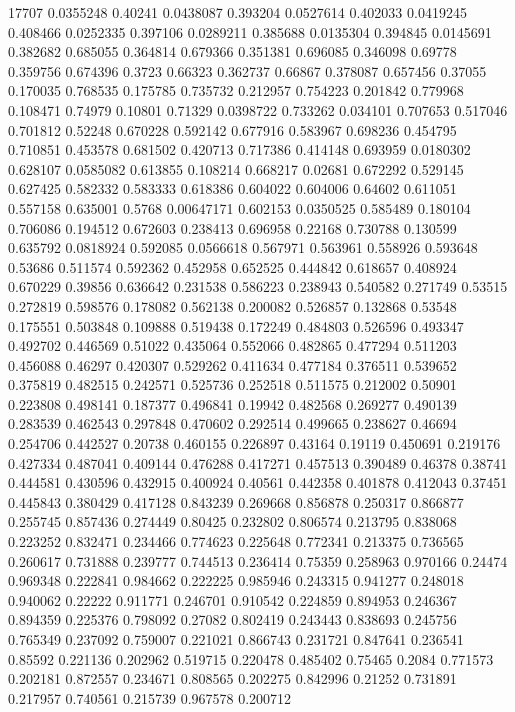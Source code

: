 17707
0.0355248 0.40241
0.0438087 0.393204
0.0527614 0.402033
0.0419245 0.408466
0.0252335 0.397106
0.0289211 0.385688
0.0135304 0.394845
0.0145691 0.382682
0.685055 0.364814
0.679366 0.351381
0.696085 0.346098
0.69778 0.359756
0.674396 0.3723
0.66323 0.362737
0.66867 0.378087
0.657456 0.37055
0.170035 0.768535
0.175785 0.735732
0.212957 0.754223
0.201842 0.779968
0.108471 0.74979
0.10801 0.71329
0.0398722 0.733262
0.034101 0.707653
0.517046 0.701812
0.52248 0.670228
0.592142 0.677916
0.583967 0.698236
0.454795 0.710851
0.453578 0.681502
0.420713 0.717386
0.414148 0.693959
0.0180302 0.628107
0.0585082 0.613855
0.108214 0.668217
0.02681 0.672292
0.529145 0.627425
0.582332 0.583333
0.618386 0.604022
0.604006 0.64602
0.611051 0.557158
0.635001 0.5768
0.00647171 0.602153
0.0350525 0.585489
0.180104 0.706086
0.194512 0.672603
0.238413 0.696958
0.22168 0.730788
0.130599 0.635792
0.0818924 0.592085
0.0566618 0.567971
0.563961 0.558926
0.593648 0.53686
0.511574 0.592362
0.452958 0.652525
0.444842 0.618657
0.408924 0.670229
0.39856 0.636642
0.231538 0.586223
0.238943 0.540582
0.271749 0.53515
0.272819 0.598576
0.178082 0.562138
0.200082 0.526857
0.132868 0.53548
0.175551 0.503848
0.109888 0.519438
0.172249 0.484803
0.526596 0.493347
0.492702 0.446569
0.51022 0.435064
0.552066 0.482865
0.477294 0.511203
0.456088 0.46297
0.420307 0.529262
0.411634 0.477184
0.376511 0.539652
0.375819 0.482515
0.242571 0.525736
0.252518 0.511575
0.212002 0.50901
0.223808 0.498141
0.187377 0.496841
0.19942 0.482568
0.269277 0.490139
0.283539 0.462543
0.297848 0.470602
0.292514 0.499665
0.238627 0.46694
0.254706 0.442527
0.20738 0.460155
0.226897 0.43164
0.19119 0.450691
0.219176 0.427334
0.487041 0.409144
0.476288 0.417271
0.457513 0.390489
0.46378 0.38741
0.444581 0.430596
0.432915 0.400924
0.40561 0.442358
0.401878 0.412043
0.37451 0.445843
0.380429 0.417128
0.843239 0.269668
0.856878 0.250317
0.866877 0.255745
0.857436 0.274449
0.80425 0.232802
0.806574 0.213795
0.838068 0.223252
0.832471 0.234466
0.774623 0.225648
0.772341 0.213375
0.736565 0.260617
0.731888 0.239777
0.744513 0.236414
0.75359 0.258963
0.970166 0.24474
0.969348 0.222841
0.984662 0.222225
0.985946 0.243315
0.941277 0.248018
0.940062 0.22222
0.911771 0.246701
0.910542 0.224859
0.894953 0.246367
0.894359 0.225376
0.798092 0.27082
0.802419 0.243443
0.838693 0.245756
0.765349 0.237092
0.759007 0.221021
0.866743 0.231721
0.847641 0.236541
0.85592 0.221136
0.202962 0.519715
0.220478 0.485402
0.75465 0.2084
0.771573 0.202181
0.872557 0.234671
0.808565 0.202275
0.842996 0.21252
0.731891 0.217957
0.740561 0.215739
0.967578 0.200712
